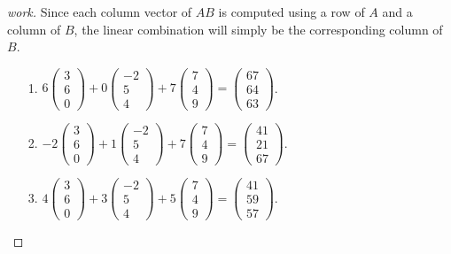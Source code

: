 \documentclass{article}
\begin{document}
\begin{enumerate}
{\begin{enumerate}
            \begin{proof}[work] Since each column vector of $AB$ is computed using a row of $A$ and a column of $B$, the linear combination will simply be the corresponding column of $B$.
                \begin{enumerate}
                    \item[1.] $6\begin{pmatrix}3 \\ 6 \\ 0\end{pmatrix} + 0\begin{pmatrix}-2 \\ 5 \\ 4\end{pmatrix} + 7\begin{pmatrix}7 \\ 4 \\ 9\end{pmatrix} = \begin{pmatrix}67 \\ 64 \\ 63\end{pmatrix}$.
                    \item[2.] $-2\begin{pmatrix}3 \\ 6 \\ 0\end{pmatrix} + 1\begin{pmatrix}-2 \\ 5 \\ 4\end{pmatrix} + 7\begin{pmatrix}7 \\ 4 \\ 9\end{pmatrix} = \begin{pmatrix}41 \\ 21 \\ 67\end{pmatrix}$.
                    \item[3.] $4\begin{pmatrix}3 \\ 6 \\ 0\end{pmatrix} + 3\begin{pmatrix}-2 \\ 5 \\ 4\end{pmatrix} + 5\begin{pmatrix}7 \\ 4 \\ 9\end{pmatrix} = \begin{pmatrix}41 \\ 59 \\ 57\end{pmatrix}$.

\end{enumerate}
\end{proof}
\end{enumerate}}
\end{enumerate}
\end{document}
